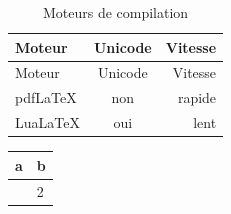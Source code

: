 \begin{longtable}[]{@{}lcr@{}}
\caption{Moteurs de compilation}\label{tbl:moteurs}\tabularnewline
\toprule\noalign{}
Moteur & Unicode & Vitesse \\
\midrule\noalign{}
\endfirsthead
\toprule\noalign{}
Moteur & Unicode & Vitesse \\
\midrule\noalign{}
\endhead
\bottomrule\noalign{}
\endlastfoot
pdfLaTeX & non & rapide \\
LuaLaTeX & oui & lent \\
\end{longtable}

{\def\LTcaptype{none} %
\begin{longtable}[]{@{}ll@{}}
\toprule\noalign{}
a & b \\
\midrule\noalign{}
\endhead
\bottomrule\noalign{}
\endlastfoot
1 & 2 \\
\end{longtable}
}
